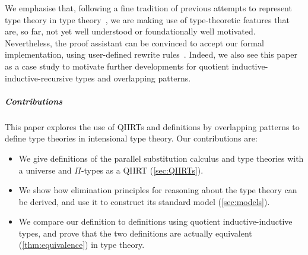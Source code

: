 \documentclass[a4paper,UKenglish,numberwithinsect,cleveref,thm-restate]{lipics-v2021}
\begin{document}

%
We emphasise that, following a fine tradition of previous attempts to represent type theory in type theory~\cite{Danielsson2006,Chapman2009,Altenkirch2016a}, we are making use of type-theoretic features that are, so far, not yet well understood or foundationally well motivated.
Nevertheless, the proof assistant \Agda can be convinced to accept our formal implementation, using user-defined rewrite rules~\cite{Cockx2020,Cockx2021}.
Indeed, we also see this paper as a case study to motivate further developments for quotient inductive-inductive-recursive types and overlapping patterns.

\subparagraph*{Contributions}
This paper explores the use of QIIRTs and definitions by overlapping patterns to define type theories in intensional type theory. Our contributions are:
\begin{itemize}
  \item We give definitions of the parallel substitution calculus and type theories with a universe and $\Pi$-types as a QIIRT (\cref{sec:QIIRTs}).
  \item We show how elimination principles for reasoning about the type theory can be derived, and use it to construct its standard model (\cref{sec:models}).
  \item We compare our definition to definitions using quotient inductive-inductive types, and prove that the two definitions are actually equivalent (\cref{thm:equivalence}) in type theory.
\end{itemize}
\end{document}
